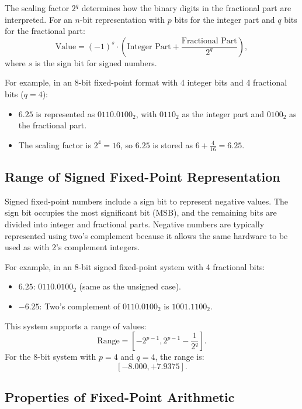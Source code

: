 The scaling factor \( 2^q \) determines how the binary digits in the fractional part are interpreted. For an \( n \)-bit representation with \( p \) bits for the integer part and \( q \) bits for the fractional part:
\[
\text{Value} = (-1)^s \cdot \left( \text{Integer Part} + \frac{\text{Fractional Part}}{2^q} \right),
\]
where \( s \) is the sign bit for signed numbers.

For example, in an 8-bit fixed-point format with 4 integer bits and 4 fractional bits (\( q = 4 \)):
\begin{itemize}[noitemsep]
    \item \( 6.25 \) is represented as \( 0110.0100_2 \), with \( 0110_2 \) as the integer part and \( 0100_2 \) as the fractional part.
    \item The scaling factor is \( 2^4 = 16 \), so \( 6.25 \) is stored as \( 6 + \frac{4}{16} = 6.25 \).
\end{itemize}


\subsection{Range of Signed Fixed-Point Representation}
Signed fixed-point numbers include a sign bit to represent negative values. The sign bit occupies the most significant bit (MSB), and the remaining bits are divided into integer and fractional parts. Negative numbers are typically represented using two's complement because it allows the same hardware to be used as with 2's complement integers.

For example, in an 8-bit signed fixed-point system with 4 fractional bits:
\begin{itemize}[noitemsep]
    \item \( 6.25 \): \( 0110.0100_2 \) (same as the unsigned case).
    \item \( -6.25 \): Two's complement of \( 0110.0100_2 \) is \( 1001.1100_2 \).
\end{itemize}

This system supports a range of values:
\[
\text{Range} = \left[ -2^{p-1}, 2^{p-1} - \frac{1}{2^q} \right].
\]
For the 8-bit system with \( p = 4 \) and \( q = 4 \), the range is:
\[
[-8.000, +7.9375].
\]

\subsection{Properties of Fixed-Point Arithmetic}

